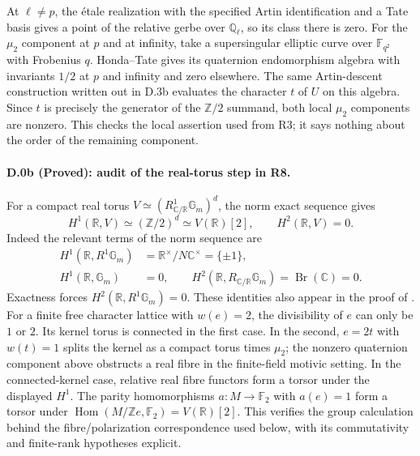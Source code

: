 At $\ell\ne p$, the \'etale realization with the specified Artin
identification and a Tate basis gives a point of the relative gerbe over
$\mathbb Q_\ell$, so its class there is zero. For the $\mu_2$ component
at $p$ and at infinity, take a supersingular elliptic curve over
$\mathbb F_{q^2}$ with Frobenius $q$. Honda--Tate gives its quaternion
endomorphism algebra with invariants $1/2$ at $p$ and infinity and
zero elsewhere. The same Artin-descent construction written out in
D.3b evaluates the character $t$ of $U$ on this algebra. Since $t$
is precisely the generator of the $\mathbb Z/2$ summand, both local
$\mu_2$ components are nonzero. This checks the local assertion used
from R3; it says nothing about the order of the remaining component.

\paragraph{D.0b (Proved): audit of the real-torus step in R8.}
For a compact real torus $V\simeq
(R^1_{\mathbb C/\mathbb R}\mathbb G_m)^d$, the norm exact sequence gives
\[
 H^1(\mathbb R,V)\simeq(\mathbb Z/2)^d\simeq V(\mathbb R)[2],
 \qquad H^2(\mathbb R,V)=0.
\]
Indeed the relevant terms of the norm sequence are
\[
 \begin{aligned}
 H^1(\mathbb R,R^1\mathbb G_m)
   &=\mathbb R^\times/N\mathbb C^\times=\{\pm1\},\\
 H^1(\mathbb R,\mathbb G_m)&=0,\qquad
 H^2(\mathbb R,R_{\mathbb C/\mathbb R}\mathbb G_m)
   =\operatorname{Br}(\mathbb C)=0 .
 \end{aligned}
\]
Exactness forces $H^2(\mathbb R,R^1\mathbb G_m)=0$.
These identities also appear in
the proof of \citet[Proposition 2.42]{Milne1994}.
For a finite free character lattice with $w(e)=2$, the divisibility
of $e$ can only be $1$ or $2$. Its kernel torus is connected in the
first case. In the second, $e=2t$ with $w(t)=1$ splits the kernel
as a compact torus times $\mu_2$; the nonzero quaternion component
above obstructs a real fibre in the finite-field motivic setting.
In the connected-kernel case, relative real fibre functors form a
torsor under the displayed $H^1$. The parity homomorphisms
$a:M\to\mathbb F_2$ with $a(e)=1$ form a torsor under
$\operatorname{Hom}(M/\mathbb Ze,\mathbb F_2)=V(\mathbb R)[2]$.
This verifies the group calculation behind the fibre/polarization
correspondence used below, with its commutativity and finite-rank
hypotheses explicit.

